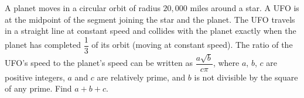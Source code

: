 A planet moves in a circular orbit of radius $20{,}000$ miles around a star. A UFO is at the midpoint of the segment joining the star and the planet. The UFO travels in a straight line at constant speed and collides with the planet exactly when the planet has completed $\dfrac{1}{3}$ of its orbit (moving at constant speed). The ratio of the UFO's speed to the planet's speed can be written as $\dfrac{a\sqrt{b}}{c\pi}$, where $a$, $b$, $c$ are positive integers, $a$ and $c$ are relatively prime, and $b$ is not divisible by the square of any prime. Find $a+b+c$.
